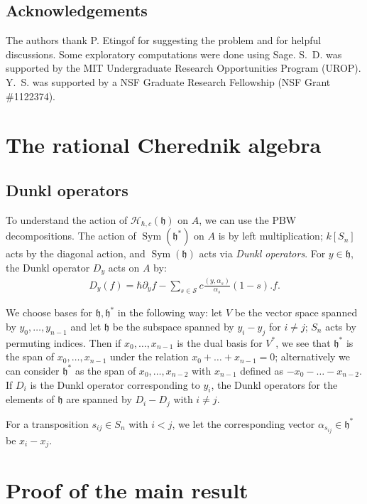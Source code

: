 \documentclass{amsart}
\numberwithin{equation}{section}
\theoremstyle{definition}
\newcommand{\h}{\mathfrak{h}}
\newcommand{\HH}{\mathcal{H}}
\newcommand{\Sym}{\operatorname{Sym}}
\begin{document}
\subsection{Acknowledgements} 

The authors thank P. Etingof for suggesting the problem and for helpful discussions.  Some exploratory computations were done using Sage.  S.~D. was supported by the MIT Undergraduate Research Opportunities Program (UROP). Y.~S. was supported by a NSF Graduate Research Fellowship (NSF Grant \#1122374).


\section{The rational Cherednik algebra}
 
\subsection{Dunkl operators}

To understand the action of $\HH_{\hbar,c}(\h)$ on $A$, we can use the PBW decompositions. The action of $\Sym(\h^*)$ on $A$ is by left multiplication; $k[S_n]$ acts by the diagonal action, and $\Sym(\h)$ acts via {\it Dunkl operators}. For $y \in \h$, the Dunkl operator $D_y$ acts on $A$ by:
\begin{align*}
D_y(f) = \hbar \partial_y f  - \sum_{s \in \mathcal{S}} c \frac{ ( y, \alpha_s )}{\alpha_s} (1-s). f.
\end{align*}

We choose bases for $\h,\h^*$ in the following way: let $V$ be the vector space spanned by $y_0,\dots,y_{n-1}$ and let $\h$ be the subspace spanned by $y_i-y_j$ for $i \ne j$; $S_n$ acts by permuting indices. Then if $x_0,\dots,x_{n-1}$ is the dual basis for $V^*$, we see that $\h^*$ is the span of $x_0,\dots,x_{n-1}$ under the relation $x_0+\dots+x_{n-1}=0$; alternatively we can consider $\h^*$ as the span of $x_0,\dots,x_{n-2}$ with $x_{n-1}$ defined as $-x_0-\dots-x_{n-2}$.  If $D_i$ is the Dunkl operator corresponding to $y_i$, the Dunkl operators for the elements of $\h$ are spanned by $D_i-D_j$ with $i \ne j$. 

For a transposition $s_{ij} \in S_n$ with $i<j$, we let the corresponding vector $\alpha_{s_{ij}} \in \h^*$ be $x_i-x_j$.



\section{Proof of the main result}
\end{document}
